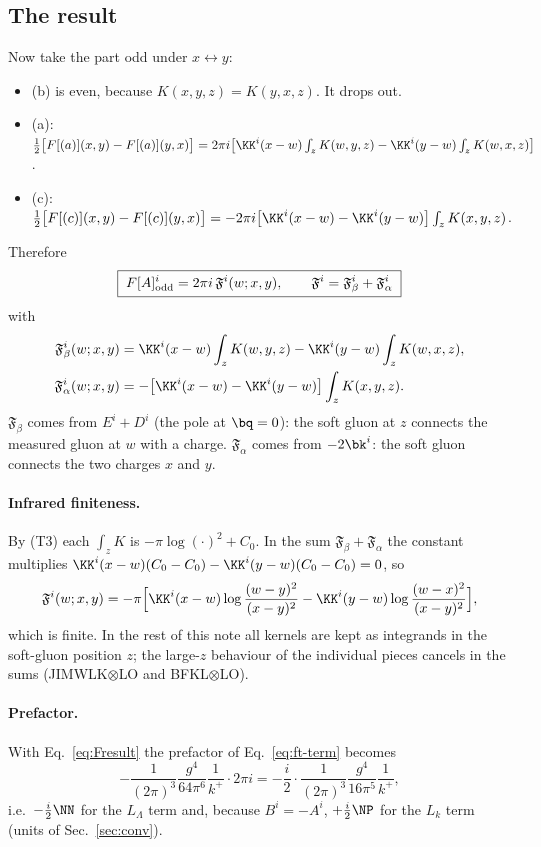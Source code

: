 \subsection{The result}\label{sec:ft-result}
Now take the part odd under $x\leftrightarrow y$:
\begin{itemize}
\item (b) is even, because $K(x,y,z)=K(y,x,z)$. It drops out.
\item (a): $\frac12\big[F[(a)](x,y)-F[(a)](y,x)\big]=2\pi i\big[\KK^i(x-w)\int_zK(w,y,z)-\KK^i(y-w)\int_zK(w,x,z)\big]$.
\item (c): $\frac12\big[F[(c)](x,y)-F[(c)](y,x)\big]=-2\pi i\big[\KK^i(x-w)-\KK^i(y-w)\big]\int_zK(x,y,z)$.
\end{itemize}
Therefore
\begin{equation}
\boxed{\;F[A]^i_{\rm odd}=2\pi i\,\mathfrak F^i(w;x,y),\qquad \mathfrak F^i=\mathfrak F^i_\beta+\mathfrak F^i_\alpha\;}
\label{eq:Fresult}
\end{equation}
with
\begin{align}
\mathfrak F^i_\beta(w;x,y)&=\KK^i(x-w)\int_zK(w,y,z)-\KK^i(y-w)\int_zK(w,x,z),\notag\\
\mathfrak F^i_\alpha(w;x,y)&=-\big[\KK^i(x-w)-\KK^i(y-w)\big]\int_zK(x,y,z).
\label{eq:Fab}
\end{align}
$\mathfrak F_\beta$ comes from $E^i+D^i$ (the pole at $\bq=0$): the soft gluon at $z$ connects the measured gluon at $w$ with a charge. $\mathfrak F_\alpha$ comes from $-2\bk^i$: the soft gluon connects the two charges $x$ and $y$.
\paragraph{Infrared finiteness.} By (T3) each $\int_zK$ is $-\pi\log(\cdot)^2+C_0$. In the sum $\mathfrak F_\beta+\mathfrak F_\alpha$ the constant multiplies $\KK^i(x-w)(C_0-C_0)-\KK^i(y-w)(C_0-C_0)=0$, so
\begin{equation}
\mathfrak F^i(w;x,y)=-\pi\Big[\KK^i(x-w)\log\frac{(w-y)^2}{(x-y)^2}-\KK^i(y-w)\log\frac{(w-x)^2}{(x-y)^2}\Big],
\label{eq:Flog}
\end{equation}
which is finite. In the rest of this note all kernels are kept as integrands in the soft-gluon position $z$; the large-$z$ behaviour of the individual pieces cancels in the sums (JIMWLK$\otimes$LO and BFKL$\otimes$LO).

\paragraph{Prefactor.} With Eq.~\eqref{eq:Fresult} the prefactor of Eq.~\eqref{eq:ft-term} becomes
\begin{equation}
-\frac{1}{(2\pi)^3}\frac{g^4}{64\pi^6}\frac1{k^+}\cdot2\pi i=-\frac i2\cdot\frac{1}{(2\pi)^3}\frac{g^4}{16\pi^5}\frac1{k^+},
\end{equation}
i.e.\ $-\frac i2\NN$ for the $L_\Lambda$ term and, because $B^i=-A^i$, $+\frac i2\NP$ for the $L_k$ term (units of Sec.~\ref{sec:conv}).

